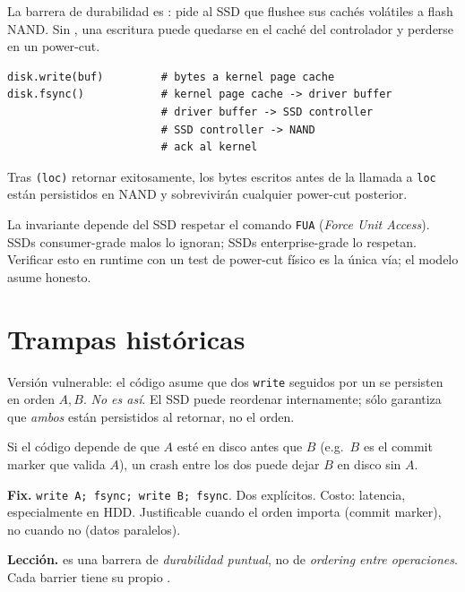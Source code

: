 La barrera de durabilidad es \fsync: pide al SSD que flushee sus cachés
volátiles a flash NAND. Sin \fsync, una escritura puede quedarse en el
caché del controlador y perderse en un power-cut.

\begin{lstlisting}[language=shellcmd, caption={Pipeline conceptual de
\fsync.}]
disk.write(buf)         # bytes a kernel page cache
disk.fsync()            # kernel page cache -> driver buffer
                        # driver buffer -> SSD controller
                        # SSD controller -> NAND
                        # ack al kernel
\end{lstlisting}

\begin{invariante}
\label{inv:fsync-persist}
Tras \fsync\texttt{(loc)} retornar exitosamente, los bytes escritos antes
de la llamada a \texttt{loc} están persistidos en NAND y sobrevivirán
cualquier power-cut posterior.
\end{invariante}

La invariante depende del SSD respetar el comando \texttt{FUA} (\emph{Force
Unit Access}). SSDs consumer-grade malos lo ignoran; SSDs enterprise-grade
lo respetan. Verificar esto en runtime con un test de power-cut físico es
la única vía; el modelo asume \fsync{} honesto.

\section{Trampas históricas}

\begin{trampa}
\label{tr:write-reorder}
Versión vulnerable: el código asume que dos \texttt{write} seguidos por
un \fsync{} se persisten en orden $A, B$. \emph{No es así}. El SSD puede
reordenar internamente; \fsync{} sólo garantiza que \emph{ambos} están
persistidos al retornar, no el orden.

Si el código depende de que $A$ esté en disco antes que $B$ (e.g.\ $B$
es el commit marker que valida $A$), un crash entre los dos \fsync{}
puede dejar $B$ en disco sin $A$.

\textbf{Fix.} \texttt{write A; fsync; write B; fsync}. Dos \fsync{}
explícitos. Costo: latencia, especialmente en HDD. Justificable cuando
el orden importa (commit marker), no cuando no (datos paralelos).

\textbf{Lección.} \fsync{} es una barrera de \emph{durabilidad puntual},
no de \emph{ordering entre operaciones}. Cada barrier tiene su propio
\fsync.
\end{trampa}

